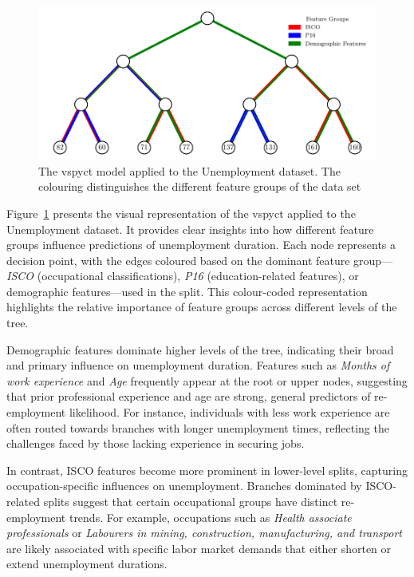 \documentclass[3p,review,authoryear]{elsarticle}
\begin{document}
\begin{figure}[h!]
    \centering
    \includegraphics{hecat_tree_new_temp.pdf}
    \caption{The \gls{vspyct} model applied to the Unemployment dataset. The colouring distinguishes the different feature groups of the data set}
    \label{fig:inter_tree}
\end{figure}


Figure~\ref{fig:inter_tree} presents the visual representation of the \gls{vspyct} applied to the Unemployment dataset.
It provides clear insights into how different feature groups influence predictions of unemployment duration.
Each node represents a decision point, with the edges coloured based on the dominant feature group—\textit{ISCO} (occupational classifications), \textit{P16} (education-related features), or demographic features—used in the split.
This colour-coded representation highlights the relative importance of feature groups across different levels of the tree.

Demographic features dominate higher levels of the tree, indicating their broad and primary influence on unemployment duration.
Features such as \textit{Months of work experience} and \textit{Age} frequently appear at the root or upper nodes, suggesting that prior professional experience and age are strong, general predictors of re-employment likelihood.
For instance, individuals with less work experience are often routed towards branches with longer unemployment times, reflecting the challenges faced by those lacking experience in securing jobs.

In contrast, ISCO features become more prominent in lower-level splits, capturing occupation-specific influences on unemployment.
Branches dominated by ISCO-related splits suggest that certain occupational groups have distinct re-employment trends.
For example, occupations such as \textit{Health associate professionals} or \textit{Labourers in mining, construction, manufacturing, and transport} are likely associated with specific labor market demands that either shorten or extend unemployment durations.
\end{document}

